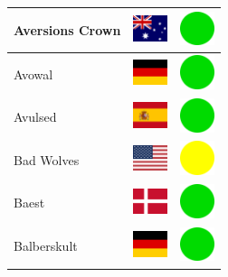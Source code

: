 \documentclass[12pt, a4paper, twoside]{report}
\begin{document}
\begin{center}
\begin{longtable}{|p{5cm}|p{2cm}|p{2cm}|}
Aversions Crown & \includegraphics[width=1cm]{4x3/au} & \includegraphics[width=1cm]{likes/y} \\ \hline
Avowal & \includegraphics[width=1cm]{4x3/de} & \includegraphics[width=1cm]{likes/y} \\ \hline
Avulsed & \includegraphics[width=1cm]{4x3/es} & \includegraphics[width=1cm]{likes/y} \\ \hline
Bad Wolves & \includegraphics[width=1cm]{4x3/us} & \includegraphics[width=1cm]{likes/m} \\ \hline
Baest & \includegraphics[width=1cm]{4x3/dk} & \includegraphics[width=1cm]{likes/y} \\ \hline
Balberskult & \includegraphics[width=1cm]{4x3/de} & \includegraphics[width=1cm]{likes/y} \\ \hline

\end{longtable}
\end{center}
\end{document}
